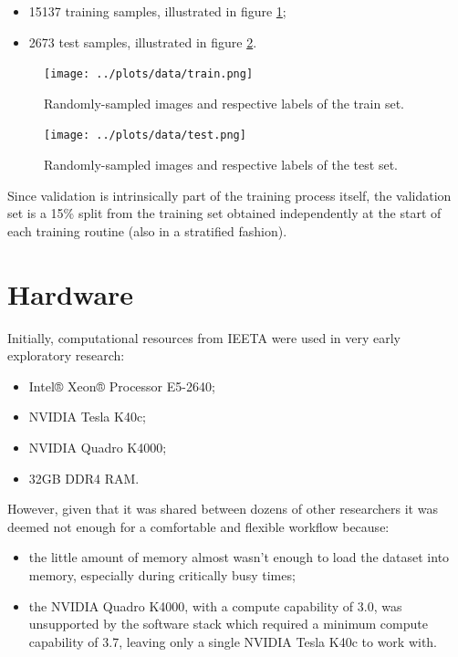 \begin{itemize}
    \item 15137 training samples, illustrated in figure \ref{fig:data_train};
    \item 2673 test samples, illustrated in figure \ref{fig:data_test}.
\end{itemize}

\begin{figure}[ht]
    \centering
    \texttt{[image: ../plots/data/train.png]}
    \caption{Randomly-sampled images and respective labels of the train set.}
    \label{fig:data_train}
\end{figure}

\begin{figure}[ht]
    \centering
    \texttt{[image: ../plots/data/test.png]}
    \caption{Randomly-sampled images and respective labels of the test set.}
    \label{fig:data_test}
\end{figure}

Since validation is intrinsically part of the training process itself, the validation set is a 15\% split from the training set obtained independently at the start of each training routine (also in a stratified fashion).

\section{Hardware}

Initially, computational resources from \ac{IEETA} were used in very early exploratory research:

\begin{itemize}
    \item Intel® Xeon® Processor E5-2640;
    \item NVIDIA Tesla K40c;
    \item NVIDIA Quadro K4000;
    \item 32GB DDR4 RAM.
\end{itemize}

However, given that it was shared between dozens of other researchers it was deemed not enough for a comfortable and flexible workflow because:

\begin{itemize}
    \item the little amount of memory almost wasn't enough to load the dataset into memory, especially during critically busy times;
    \item the NVIDIA Quadro K4000, with a compute capability of 3.0, was unsupported by the software stack which required a minimum compute capability of 3.7, leaving only a single NVIDIA Tesla K40c to work with.
\end{itemize}

